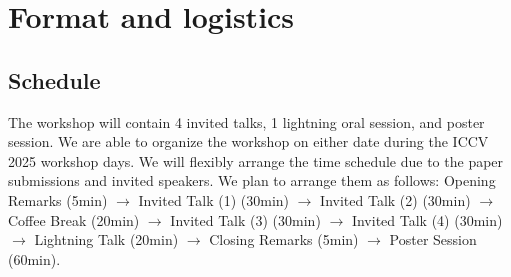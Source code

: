 \documentclass{article}
\newcommand\conf{ICCV 2025\xspace}
\def\c#1{\textcolor{gray}{#1}}
\begin{document}
\section{Format and logistics}
\subsection{Schedule}

The workshop will contain 4 invited talks, 1 lightning oral session, and poster session. We are able to organize the workshop on either date during the ICCV 2025 workshop days. We will flexibly arrange the time schedule due to the paper submissions and invited speakers. We plan to arrange them as follows: Opening Remarks (5min) $\rightarrow$ Invited Talk (1) (30min) $\rightarrow$ Invited Talk (2)  (30min) $\rightarrow$ Coffee Break (20min) $\rightarrow$ Invited Talk (3) (30min) $\rightarrow$ Invited Talk (4) (30min) $\rightarrow$ Lightning Talk (20min) $\rightarrow$ Closing Remarks (5min) $\rightarrow$ Poster Session (60min).

\end{document}

